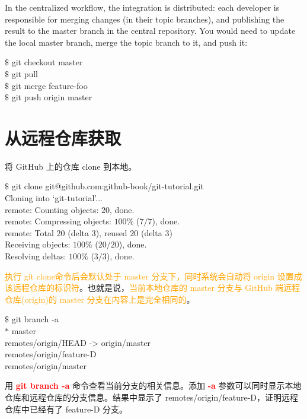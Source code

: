 \documentclass[12pt,a4paper]{article}
\begin{document}
In the centralized workflow, the integration is distributed: each developer is responsible for merging changes (in their topic branches), and publishing the result to the master branch in the central repository. You would need to update the local master branch, merge the topic branch to it, and push it:
\begin{tcolorbox}[colback=green!5,colframe=green!40!black,title= ]
$\$$ git checkout master \\
$\$$ git pull \\
$\$$ git merge feature-foo \\
$\$$ git push origin master
\end{tcolorbox}


\section{从远程仓库获取}
将 GitHub 上的仓库 clone 到本地。
\begin{tcolorbox}[colback=green!5,colframe=green!40!black,title= ]
$\$$ git clone git@github.com:github-book/git-tutorial.git \\
Cloning into `git-tutorial'... \\
remote: Counting objects: $20$, done. \\
remote: Compressing objects: $100\%$ ($7/7$), done. \\
remote: Total $20$ (delta $3$), reused $20$ (delta $3$) \\
Receiving objects: $100\%$ ($20/20$), done. \\
Resolving deltas: $100\%$ ($3/3$), done. \\
\end{tcolorbox}
\textcolor{orange}{执行 git clone命令后会默认处于 master 分支下，同时系统会自动将 origin 设置成该远程仓库的标识符}。也就是说，\textcolor{orange}{当前本地仓库的 master 分支与 GitHub 端远程仓库(origin)的 master 分支在内容上是完全相同的}。
\begin{tcolorbox}[colback=green!5,colframe=green!40!black,title= ]
$\$$ git branch -a \\
$\ast$ master \\
remotes/origin/HEAD -> origin/master \\
remotes/origin/feature-D \\
remotes/origin/master 
\end{tcolorbox}
用 \textcolor{red}{\bf git branch -a} 命令查看当前分支的相关信息。添加 \textcolor{red}{\bf -a} 参数可以同时显示本地仓库和远程仓库的分支信息。结果中显示了 remotes/origin/feature-D，证明远程仓库中已经有了 feature-D 分支。
\end{document}
